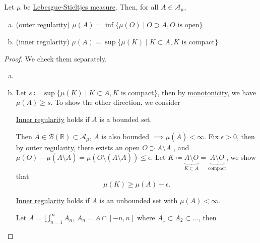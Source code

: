 \begin{theorem}[Regularity]\label{thm:regularity}
	Let \(\mu\) be \hyperref[def:Lebesgue-Stieltjes-measure]{Lebesgue-Stieltjes measure}. Then, for all \(A\in \mathcal{A} _\mu \),
	\begin{enumerate}[(a)]
		\item\label{thm:outer-regularity} (outer regularity) \(\mu (A) = \inf \{\mu (O) \mid O\supset A, O\text{ is open}\}\)
		\item\label{thm:inner-regularity} (inner regularity) \(\mu (A) = \sup \{\mu (K) \mid K\subset A, K\text{ is compact}\}\)
	\end{enumerate}
\end{theorem}
\begin{proof}
	We check them separately.
	\begin{enumerate}[(a)]
		\item {}
		\item Let \(s \coloneqq \sup \{\mu (K) \mid K\subset A, K\text{ is compact} \}\), then by \hyperref[thm:measure-space-monotonicity]{monotonicity}, we have \(\mu (A)\geq s\).
		      To show the other direction, we consider
		      \begin{claim}
			      \hyperref[thm:inner-regularity]{Inner regularity} holds if \(A\) is a bounded set.
		      \end{claim}
		      \begin{explanation}
			      Then \(\overline{A} \in \mathcal{B} (\mathbb{R} )\subset \mathcal{A} _\mu \),
			      \(\overline{A} \) is also bounded \(\implies \mu (\overline{A} ) < \infty \). Fix \(\epsilon >0\), then by \hyperref[thm:outer-regularity]{outer regularity},
			      there exists an open \(O\supset \overline{A} \setminus A\) , and \(\mu (O) - \mu (\overline{A} \setminus A) = \mu (O\setminus (\overline{A} \setminus A))\leq \epsilon \).
			      Let \(K\coloneqq \underbrace{A\setminus O}_{K\subset A} = \underbrace{\overline{A} \setminus O}_{\text{compact}}\), we show that
			      \[
				      \mu (K)\geq \mu (A) - \epsilon .
			      \]
		      \end{explanation}
		      \begin{claim}
			      \hyperref[thm:inner-regularity]{Inner regularity} holds if \(A\) is an unbounded set with \(\mu (A)<\infty \).
		      \end{claim}
		      \begin{explanation}
			      Let \(A = \bigcup_{n=1}^{\infty} A_{n}\), \(A_{n} = A\cap [-n, n]\) where
			      \(A_1\subset A_2\subset \dots  \), then

\end{explanation}
\end{enumerate}
\end{proof}
